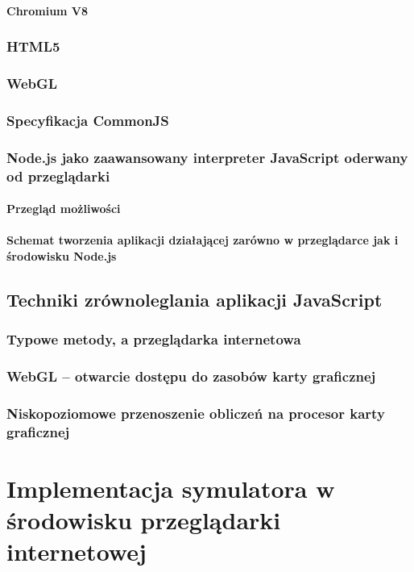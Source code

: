\documentclass[pdflatex,11pt]{aghdpl}
\begin{document}
			\subsubsection{Chromium V8}
		\subsection{HTML5}
		\subsection{WebGL}
		\subsection{Specyfikacja CommonJS}
		\subsection{Node.js jako zaawansowany interpreter JavaScript oderwany od przeglądarki}
			\subsubsection{Przegląd możliwości}
			\subsubsection{Schemat tworzenia aplikacji działającej zarówno w przeglądarce jak i
							środowisku Node.js}
									
	\section{Techniki zrównoleglania aplikacji JavaScript}
		\subsection{Typowe metody, a przeglądarka internetowa}
		\subsection{WebGL -- otwarcie dostępu do zasobów karty graficznej}
		\subsection{Niskopoziomowe przenoszenie obliczeń na procesor karty graficznej}		

\chapter{Implementacja symulatora w środowisku przeglądarki internetowej}
\end{document}

